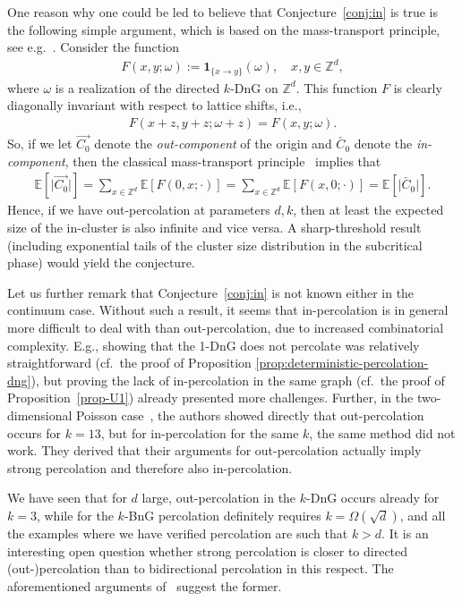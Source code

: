 \documentclass[a4paper, oneside, 11pt]{amsart}
\theoremstyle{definition}
\newcommand{\1}{\mathbbm{1}}
\newcommand{\0}{\mathbf{o}}
\newcommand{\Z}{\mathbb{Z}}
\numberwithin{equation}{section}
\begin{document}
One reason why one could be led to believe that Conjecture~\ref{conj:in} is true is the following simple argument, which is based on the mass-transport principle, see e.g.~\cite[Chapter 8]{lyons_peres_2017}. Consider the function
\begin{align*}
    F(x,y;\omega) := \mathbf{1}_{\{x \to y\}}(\omega), \quad x,y\in \Z^d,
\end{align*}
where $\omega$ is a realization of the directed $k$-DnG on $\Z^d$. This function $F$ is clearly diagonally invariant with respect to lattice shifts, i.e.,
\begin{align*}
    F(x+z,y+z;\omega+z) = F(x,y;\omega).
\end{align*}
So, if we let $\overrightarrow{C_0}$ denote the \textit{out-component} of the origin and $\overleftarrow{C_0}$ denote the \textit{in-component}, then the classical mass-transport principle~\cite[p.~274]{lyons_peres_2017} implies that
\begin{align*}
\mathbb{E}\left[\lvert\overrightarrow{C_0}\rvert\right] = \sum_{x \in \Z^d}\mathbb{E}[F(0,x;\cdot)]
    =\sum_{x \in \Z^d}\mathbb{E}[F(x,0;\cdot)]=\mathbb{E}\left[\lvert\overleftarrow{C_0}\rvert\right]. 
\end{align*}
Hence, if we have out-percolation at parameters $d,k$, then at least the expected size of the in-cluster is also infinite and vice versa. A sharp-threshold result (including exponential tails of the cluster size distribution in the subcritical phase) would yield the conjecture.

Let us further remark that Conjecture~\ref{conj:in} is not known either in the continuum case. Without such a result, it seems that in-percolation is in general more difficult to deal with than out-percolation, due to increased combinatorial complexity. E.g., showing that the 1-DnG does not percolate was relatively straightforward (cf.~the proof of Proposition \ref{prop:deterministic-percolation-dng}), but proving the lack of in-percolation in the same graph (cf.~the proof of Proposition~\ref{prop-U1}) already presented more challenges. Further, in the two-dimensional Poisson case~\cite[Proof of Theorem 2]{BalisterBollobas13}, the authors showed directly that 
out-percolation occurs for $k=13$, but for in-percolation for the same $k$, the same method did not work. 
They derived that their arguments for out-percolation actually imply strong percolation and therefore also in-percolation.

We have seen that for $d$ large, out-percolation in the $k$-DnG occurs already for $k=3$, while for the $k$-BnG percolation definitely requires $k=\Omega(\sqrt d)$, and all the examples where we have verified percolation are such that $k>d$. It is an interesting open question whether strong percolation is closer to directed (out-)percolation than to bidirectional percolation in this respect.  The aforementioned arguments of~\cite{BalisterBollobas13} suggest the former. 
\end{document}
